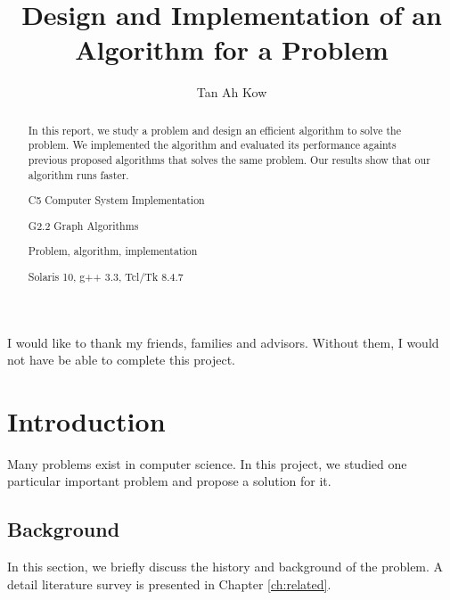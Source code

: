 \documentclass[fyp]{socreport}
\begin{document}
\title{Design and Implementation of an Algorithm for a Problem}
\author{Tan Ah Kow}
\maketitle
\begin{abstract}
In this report, we study a problem and design an efficient algorithm
to solve the problem.  We implemented the algorithm and evaluated
its performance againts previous proposed algorithms that solves the
same problem.  Our results show that our algorithm runs faster.

\begin{descriptors}
    \item C5 Computer System Implementation
	\item G2.2 Graph Algorithms
\end{descriptors}
\begin{keywords}
	Problem, algorithm, implementation
\end{keywords}
\begin{implement}
	Solaris 10, g++ 3.3, Tcl/Tk 8.4.7
\end{implement}
\end{abstract}

\begin{acknowledgement}
   I would like to thank my friends, families and advisors.
   Without them, I would not have be able to complete this project.
\end{acknowledgement}

\listoffigures 
\listoftables
\tableofcontents 

\chapter{Introduction}
Many problems exist in computer science.  In this project, we 
studied one particular important problem and propose a solution 
for it.  

\section{Background}
In this section, we briefly discuss the history and background
of the problem.  A detail literature survey is presented in 
Chapter \ref{ch:related}.
\end{document}
